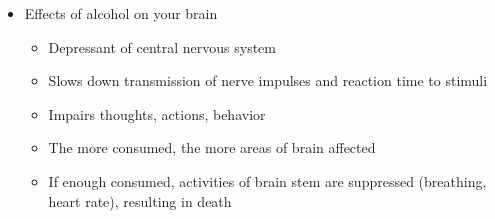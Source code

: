 \documentclass[12pt]{article}
\begin{document}
\begin{itemize}
\begin{itemize}
                    \end{itemize}
                \item Effects of alcohol on your brain
                    \begin{itemize}
                        \item Depressant of central nervous system
                        \item Slows down transmission of nerve impulses and reaction time to stimuli
                        \item Impairs thoughts, actions, behavior
                        \item The more consumed, the more areas of brain affected
                        \item If enough consumed, activities of brain stem are suppressed (breathing, heart rate), resulting in death
                    \end{itemize}
            \end{itemize}
\end{document}
